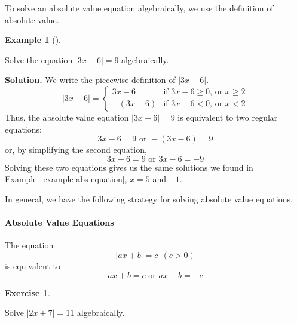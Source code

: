 \documentclass[10pt,]{book}
\theoremstyle{plain}
\theoremstyle{definition}
\theoremstyle{definition}
\theoremstyle{definition}
\newtheorem{example}[theorem]{Example}
\theoremstyle{definition}
\theoremstyle{definition}
\newtheorem{exercise}[theorem]{Exercise}
\numberwithin{equation}{section}
\newcommand\abs[1]{\left|#1\right|}
\newcommand{\lt}{ < }
\newcommand{\gt}{ > }
\newcommand{\amp}{ & }
\begin{document}
    To solve an absolute value equation algebraically, we use the definition of absolute value.
%
\begin{example}[]\label{example-abs-algebraic}

        Solve the equation \(\abs{3x − 6} = 9\) algebraically.
\par\medskip\noindent%
\textbf{Solution.}\quad 
    We write the piecewise definition of \(\abs{3x − 6}\).
    \begin{equation*}
    \abs{3x-6} =
    \begin{cases}
    3x-6 \amp \text{if } 3x-6\ge 0 \text{, or  } x\ge 2\\
    -(3x-6)  \amp \text{if } 3x − 6\lt 0  \text{, or  }x\lt 2
    \end{cases}
    \end{equation*}
    Thus, the absolute value equation \(\abs{3x − 6} = 9\) is equivalent to two regular equations:
    \begin{equation*}3x − 6 =9  \text{ or } −(3x − 6) = 9\end{equation*}
    or, by simplifying the second equation,
    \begin{equation*}3x − 6 =9 \text{ or } 3x − 6 = −9\end{equation*}
    Solving these two equations gives us the same solutions we found in \hyperref[example-abs-equation]{Example~\ref{example-abs-equation}}, \(x = 5\) and \(−1\).
\end{example}
\par

    In general, we have the following strategy for solving absolute value equations.
%
\typeout{************************************************}
\typeout{************************************************}
\paragraph[Absolute Value Equations]{Absolute Value Equations}\label{paragraphs-31}
%
\par

    The equation
    \begin{equation*}\abs{ax + b} = c ~~ (c \gt 0)\end{equation*}
    is equivalent to
    \begin{equation*}ax + b = c \text{ or } ax + b = −c\end{equation*}
%
\begin{exercise}\label{exercise-solve-abs-algebraic}

    Solve \(\abs{2x + 7} = 11\) algebraically.
\end{exercise}
\typeout{************************************************}
\typeout{************************************************}
\end{document}
